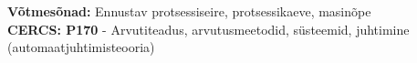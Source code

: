\begin{abstracts}

{\Large \bfseries V\~{o}tmes\~{o}nad:}
Ennustav protsessiseire, protsessikaeve, masin\~{o}pe
\\




{\large \bfseries CERCS: P170}  - Arvutiteadus, arvutusmeetodid, s\"{u}steemid, juhtimine (automaatjuhtimisteooria)




\end{abstracts}

\let\cleardoublepage\clearpage
